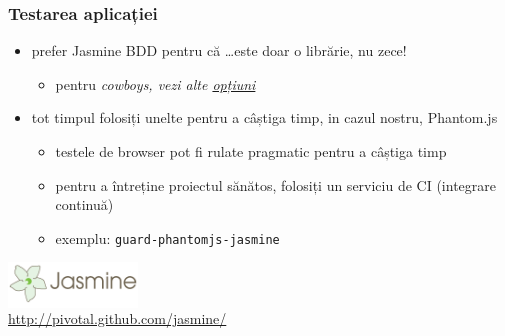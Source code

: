 \documentclass[compress]{beamer}
\begin{document}
\begin{frame}

\frametitle{Testarea aplicației}

\begin{itemize}[<+->]
  \item prefer Jasmine BDD pentru că \ldots este doar o librărie, nu zece!
  \begin{itemize}[<+->]
    \item pentru \em{cowboys}, vezi alte \href{https://github.com/rwldrn/idiomatic.js/\#test-facility}{opțiuni}
  \end{itemize}
  \item tot timpul folosiți unelte pentru a câștiga timp, in cazul nostru, Phantom.js
  \begin{itemize}[<+->]
    \item testele de browser pot fi rulate pragmatic pentru a câștiga timp
    \item pentru a întreține proiectul sănătos, folosiți un serviciu de CI (integrare continuă)
    \item exemplu: \texttt{guard-phantomjs-jasmine}
  \end{itemize}
\end{itemize}

\begin{flushright}
  \colorbox{white}{\includegraphics[height=1.1cm]{jasmine.png}}
  \\
  \tiny \url{http://pivotal.github.com/jasmine/}
\end{flushright}


\end{frame}
\end{document}
